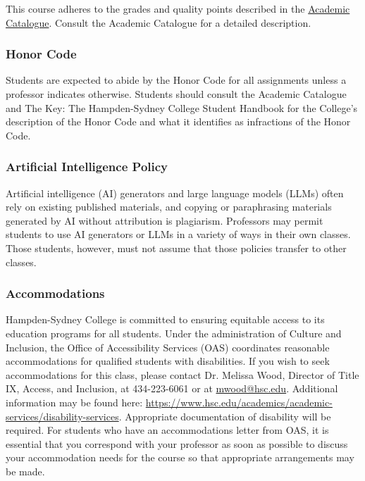 \documentclass[10pt]{article}
\begin{document}
This course adheres to the grades and quality points described in the \href{https://www.hsc.edu/academic-catalogues}{Academic Catalogue}. Consult the Academic Catalogue for a detailed description. 


\subsubsection*{Honor Code}

Students are expected to abide by the Honor Code for all assignments unless a professor indicates otherwise. Students should consult the Academic Catalogue and The Key: The Hampden-Sydney College Student Handbook for the College’s description of the Honor Code and what it identifies as infractions of the Honor Code.

\subsubsection*{Artificial Intelligence Policy}

Artificial intelligence (AI) generators and large language models (LLMs) often rely on existing published materials, and copying or paraphrasing materials generated by AI without attribution is plagiarism. Professors may permit students to use AI generators or LLMs in a variety of ways in their own classes. Those students, however, must not assume that those policies transfer to other classes.

\subsubsection*{Accommodations}

Hampden-Sydney College is committed to ensuring equitable access to its education programs for all students. Under the administration of Culture and Inclusion, the Office of Accessibility Services (OAS) coordinates reasonable accommodations for qualified students with disabilities. If you wish to seek accommodations for this class, please contact Dr. Melissa Wood, Director of Title IX, Access, and Inclusion, at 434-223-6061 or at \url{mwood@hsc.edu}. Additional information may be found here: \url{https://www.hsc.edu/academics/academic-services/disability-services}. Appropriate documentation of disability will be required. For students who have an accommodations letter from OAS, it is essential that you correspond with your professor as soon as possible to discuss your accommodation needs for the course so that appropriate arrangements may be made.
\end{document}
